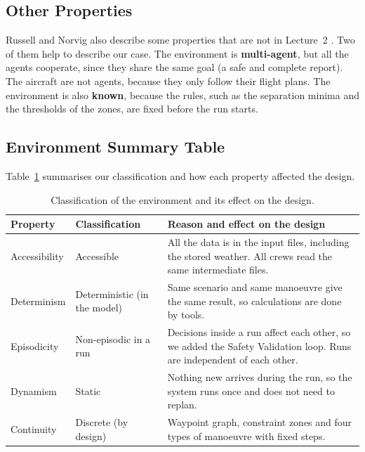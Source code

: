 \subsection{Other Properties}

Russell and Norvig also describe some properties that are not in Lecture~2
\cite{russellnorvig2020}. Two of them help to describe our case. The environment is
\textbf{multi-agent}, but all the agents cooperate, since they share the same goal (a safe
and complete report). The aircraft are not agents, because they only follow their flight
plans. The environment is also \textbf{known}, because the rules, such as the separation
minima and the thresholds of the zones, are fixed before the run starts.

\subsection{Environment Summary Table}

Table~\ref{tab:environment} summarises our classification and how each property affected
the design.

\begin{table}[H]
\centering
\small
\caption{Classification of the environment and its effect on the design.}
\label{tab:environment}
\begin{tabularx}{\textwidth}{@{}l l X@{}}
\toprule
\textbf{Property} & \textbf{Classification} & \textbf{Reason and effect on the design} \\
\midrule
Accessibility & Accessible & All the data is in the input files, including the stored
  weather. All crews read the same intermediate files. \\
Determinism & Deterministic (in the model) & Same scenario and same manoeuvre give the same
  result, so calculations are done by tools. \\
Episodicity & Non-episodic in a run & Decisions inside a run affect each other, so we added
  the Safety Validation loop. Runs are independent of each other. \\
Dynamism & Static & Nothing new arrives during the run, so the system runs once and does
  not need to replan. \\
Continuity & Discrete (by design) & Waypoint graph, constraint zones and four types of
  manoeuvre with fixed steps. \\
\bottomrule
\end{tabularx}
\end{table}
